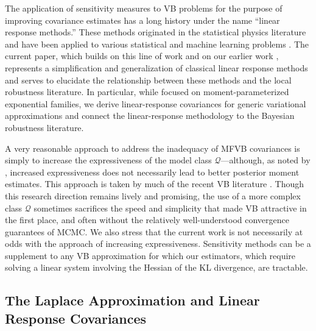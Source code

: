 \documentclass{article}\usepackage[]{graphicx}\usepackage[]{color}
\theoremstyle{definition}
\theoremstyle{plain}
\theoremstyle{plain}
\theoremstyle{plain}
\theoremstyle{definition}
\theoremstyle{plain}
\theoremstyle{plain}
\begin{document}
The application of sensitivity measures to VB problems for the purpose
of improving covariance estimates has a long history under the name
``linear response methods.'' These methods originated in the statistical
physics literature
\citep{tanaka:2000:information,opper:2001:advancedmeanfield}
and have been applied to various statistical and machine learning
problems
\citep{kappen:1998:efficient,tanaka:1998:mean,welling:2004:linear,opper:2003:variational}.
The current paper, which builds on this line of work and on our earlier work
\citep{giordano:2015:lrvb}, represents a simplification and generalization
of classical linear response methods and serves to elucidate the
relationship between these methods and the local robustness literature.
In particular, while \citet{giordano:2015:lrvb} focused on moment-parameterized
exponential families, we derive linear-response covariances for generic
variational approximations and connect the linear-response methodology
to the Bayesian robustness literature.

A very reasonable approach to address the inadequacy of MFVB covariances is
simply to increase the expressiveness of the model class $\mathcal{Q}$---although, as noted by \citet{turner:2011:two}, increased expressiveness
does not necessarily lead to better posterior moment estimates. This approach is
taken by much of the recent VB literature
\citep[e.g.,][]{tran:2015:copula,tran:2015:gp,ranganath:2015:hierarchical,rezende:2015:flows,liu:2016:stein}.
Though this research direction remains lively and promising, the
use of a more complex class $\mathcal{Q}$ sometimes sacrifices the
speed and simplicity that made VB attractive in the first place, and
often without the relatively well-understood convergence guarantees
of MCMC. We also stress that the current work is not necessarily
at odds with the approach of increasing expressiveness. Sensitivity
methods can be a supplement to any VB approximation for which our
estimators, which require solving a linear system involving the Hessian
of the KL divergence, are tractable.

\subsection{The Laplace Approximation and Linear Response Covariances
\label{subsec:laplace_approx}}
\end{document}
